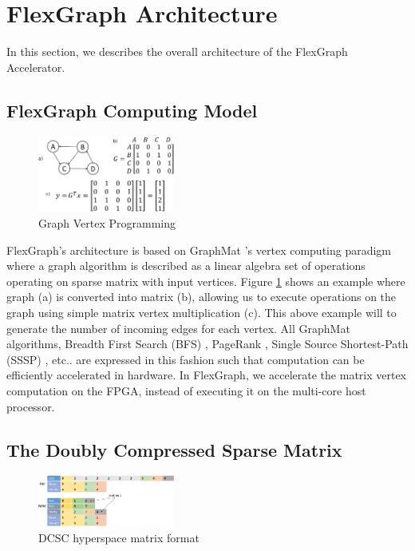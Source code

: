 \section{FlexGraph Architecture}

In this section, we describes the overall architecture of the FlexGraph Accelerator.

\subsection{FlexGraph Computing Model}

\begin{figure}[htbp]
\includegraphics[width=0.4\textwidth]{figures/graph_vertex_programming}
\caption{Graph Vertex Programming}
\label{fig:graph_vertex_programming}
\end{figure}

FlexGraph's architecture is based on GraphMat \cite{GraphMat}'s vertex computing paradigm where a graph algorithm is described as a linear algebra set of operations operating on sparse matrix with input vertices. Figure \ref{fig:graph_vertex_programming} shows an example where graph (a) is converted into matrix (b), allowing us to execute operations on the graph using simple matrix vertex multiplication (c). This above example will to generate the number of incoming edges for each vertex. All GraphMat algorithms, Breadth First Search (BFS) \cite{BFS}, PageRank \cite{PageRank}, Single Source Shortest-Path (SSSP) \cite{SSSP}, etc.. are expressed in this fashion such that computation can be efficiently accelerated in hardware. In FlexGraph, we accelerate the matrix vertex computation on the FPGA, instead of executing it on the multi-core host processor.

\subsection{The Doubly Compressed Sparse Matrix}

\begin{figure}[htbp]
\includegraphics[width=0.4\textwidth]{figures/DCSC_matrix_format}
\caption{DCSC hyperspace matrix format}
\label{fig:DCSC_matrix_format}
\end{figure}

